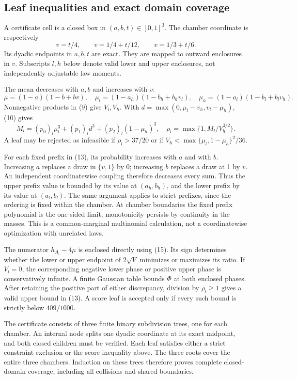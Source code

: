 \documentclass[11pt,a4paper]{article}
\numberwithin{equation}{section}
\theoremstyle{definition}
\theoremstyle{remark}
\begin{document}
\subsection{Leaf inequalities and exact domain coverage}
A certificate cell is a closed box in $(a,b,t)\in[0,1]^3$.
The chamber coordinate is respectively
\[
 v=t/4,\qquad v=1/4+t/12,\qquad v=1/3+t/6.\tag{14}
\]
Its dyadic endpoints in $a,b,t$ are exact. They are mapped to outward
enclosures in $v$. Subscripts $l,h$ below denote valid lower and upper
enclosures, not independently adjustable law moments.

The mean decreases with $a,b$ and increases with $v$:
\[
 \mu=(1-a)(1-b+bv),\quad
 \mu_l=(1-a_h)(1-b_h+b_hv_l),\quad
 \mu_h=(1-a_l)(1-b_l+b_lv_h).\tag{15}
\]
Nonnegative products in (9) give $V_l,V_h$. With
$d=\max(0,\mu_l-v_h,v_l-\mu_h)$, (10) gives
\[
 M_l=(p_0)_l\mu_l^3+(p_1)_ld^3+(p_2)_l(1-\mu_h)^3,\quad
 \rho_l=\max\{1,M_l/V_h^{3/2}\}.\tag{16}
\]
A leaf may be rejected as infeasible if $\rho_l>37/20$ or if
$V_h<\max\{\mu_l,1-\mu_h\}^2/36$.

For each fixed prefix in (13), its probability increases with $a$ and
with $b$. Increasing $a$ replaces a draw in $\{v,1\}$ by 0; increasing
$b$ replaces a draw at 1 by $v$. An independent coordinatewise coupling
therefore decreases every sum. Thus the upper prefix value is bounded
by its value at $(a_h,b_h)$, and the lower prefix by its value at
$(a_l,b_l)$. The same argument applies to strict prefixes, since the
ordering is fixed within the chamber. At chamber boundaries the fixed
prefix polynomial is the one-sided limit; monotonicity persists by
continuity in the masses. This is a common-marginal multinomial
calculation, not a coordinatewise optimization with unrelated laws.

The numerator $h_{A_t}-4\mu$ is enclosed directly using (15).
Its sign determines whether the lower or upper endpoint of $2\sqrt V$
minimizes or maximizes its ratio. If $V_l=0$, the corresponding negative
lower phase or positive upper phase is conservatively infinite. A
finite Gaussian table bounds $\Phi$ at both enclosed phases.
After retaining the positive part of either discrepancy, division by
$\rho_l\ge1$ gives a valid upper bound in (13). A score leaf is
accepted only if every such bound is strictly below $409/1000$.

The certificate consists of three finite binary subdivision trees,
one for each chamber. An internal node splits one dyadic coordinate
at its exact midpoint, and both closed children must be verified.
Each leaf satisfies either a strict constraint exclusion or the score
inequality above. The three roots cover the entire three chambers.
Induction on these trees therefore proves complete closed-domain
coverage, including all collisions and shared boundaries.
\end{document}
